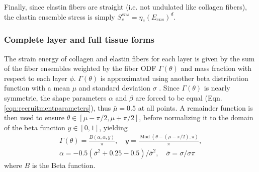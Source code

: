     Finally, since elastin fibers are straight (i.e. not undulated like collagen fibers), the elastin ensemble stress is simply $S_e^{ens} = \eta_e(E_{ens})^d$.
    



\subsubsection{Complete layer and full tissue forms}

    The strain energy of collagen and elastin fibers for each layer is given by the sum of the fiber ensembles weighted by the fiber ODF $\Gamma(\theta)$ and mass fraction with respect to each layer $\phi$. $\Gamma(\theta)$ is approximated using another beta distribution function with a mean $\mu$ and standard deviation $\sigma$ \cite{fata_insights_2014}. Since $\Gamma(\theta)$ is nearly symmetric, the shape parameters $\alpha$ and $\beta$ are forced to be equal (Eqn. \ref{eqn:recruitmentparameters}), thus $\bar{\mu} = 0.5$ at all points. A remainder function is then used to ensure $\theta \in \left[\mu - \pi/2, \mu + \pi/2 \right]$, before normalizing it to the domain of the beta function $y \in \left[0,1\right]$, yielding
        \begin{equation}\label{eqn:orientatinodistributionfunction}
        \begin{aligned}
        \Gamma(\theta) = \frac{B(\alpha,\alpha,y)}{\pi}, \quad y = \frac{\operatorname{Mod}(\theta - (\mu -     \pi/2), \pi)}{\pi}, \\
        \alpha = -0.5 \left(\bar{\sigma}^2 + 0.25 -0.5\right)/\bar{\sigma}^2, \quad \bar{\sigma} = \sigma/\sigma\pi
        \end{aligned}
        \end{equation}
    where $B$ is the Beta function.
    
